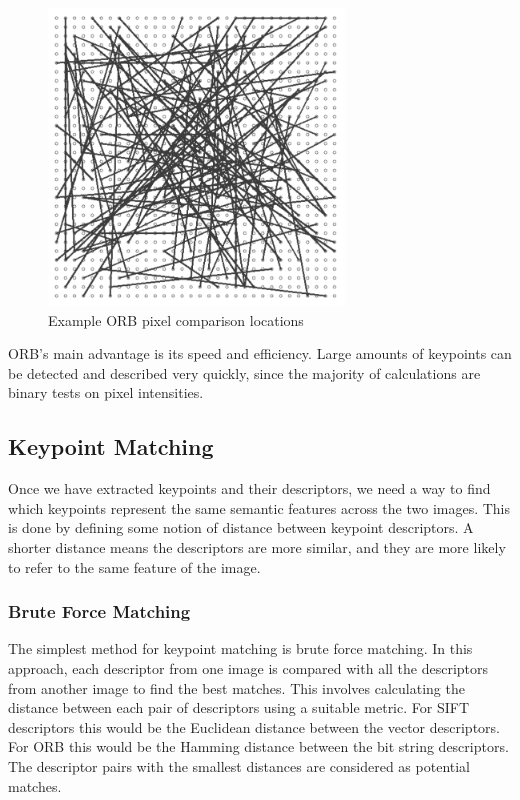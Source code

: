 \begin{figure}[ht]
    \centering
    \includegraphics[width=0.7\textwidth]{figures/ORB.png}
    \caption{Example ORB pixel comparison locations \cite{BRIEF}}
    \label{fig:ORB}
\end{figure}

ORB's main advantage is its speed and efficiency. Large amounts of keypoints can be detected and described very quickly, since the majority of calculations are binary tests on pixel intensities.\\


\subsection{Keypoint Matching}
Once we have extracted keypoints and their descriptors, we need a way to find which keypoints represent the same semantic features across the two images. This is done by defining some notion of distance between keypoint descriptors. A shorter distance means the descriptors are more similar, and they are more likely to refer to the same feature of the image.\\

\subsubsection{Brute Force Matching}
The simplest method for keypoint matching is brute force matching. In this approach, each descriptor from one image is compared with all the descriptors from another image to find the best matches. This involves calculating the distance between each pair of descriptors using a suitable metric. For SIFT descriptors this would be the Euclidean distance between the vector descriptors. For ORB this would be the Hamming distance between the bit string descriptors. The descriptor pairs with the smallest distances are considered as potential matches.\\

